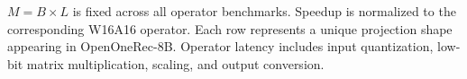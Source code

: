 
\begin{table}[t]
\centering
\caption{Prefill operator speedup across representative projection shapes.}
\label{tab:prefill_operator_speedup}

\vspace{0.4em}
\begin{minipage}{0.76\textwidth}
\footnotesize
$M=B\times L$ is fixed across all operator benchmarks.
Speedup is normalized to the corresponding W16A16 operator.
Each row represents a unique projection shape appearing in OpenOneRec-8B.
Operator latency includes input quantization, low-bit matrix multiplication, scaling, and output conversion.
\end{minipage}
\end{table}
